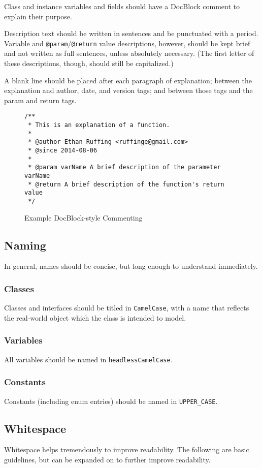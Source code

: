 \documentclass[12pt,letter]{memoir} %
\begin{document}
			Class and instance variables and fields should have a DocBlock
			comment to explain their purpose.
			
			Description text should be written in sentences and be punctuated
			with a period. Variable and \texttt{@param}/\texttt{@return} value
			descriptions, however, should be kept brief and not written as full
			sentences, unless absolutely necessary. (The first letter of these
			descriptions, though, should still be capitalized.)
			
			A blank line should be placed after each paragraph of explanation;
			between the explanation and author, date, and version tags; and
			between those tags and the param and return tags.
			\begin{figure}[h!]
				\label{lst:docblock-oop}
				\caption{Example DocBlock-style Commenting}
				\lstset{language=Java}
				\begin{lstlisting}
/**
 * This is an explanation of a function.
 * 
 * @author Ethan Ruffing <ruffinge@gmail.com>
 * @since 2014-08-06
 * 
 * @param varName A brief description of the parameter varName
 * @return A brief description of the function's return value
 */
				\end{lstlisting}
			\end{figure}
		\subsection{Naming}
			In general, names should be concise, but long enough to understand
			immediately.
			\subsubsection{Classes}
				Classes and interfaces should be titled in \texttt{CamelCase},
				with a name that reflects the real-world object which the class
				is intended to model.
			\subsubsection{Variables}
				All variables should be named in \texttt{headlessCamelCase}.
			\subsubsection{Constants}
				Constants (including enum entries) should be named in
				\texttt{UPPER\_CASE}.
		\subsection{Whitespace}
			Whitespace helps tremendously to improve readability. The following
			are basic guidelines, but can be expanded on to further improve
			readability.
\end{document}
